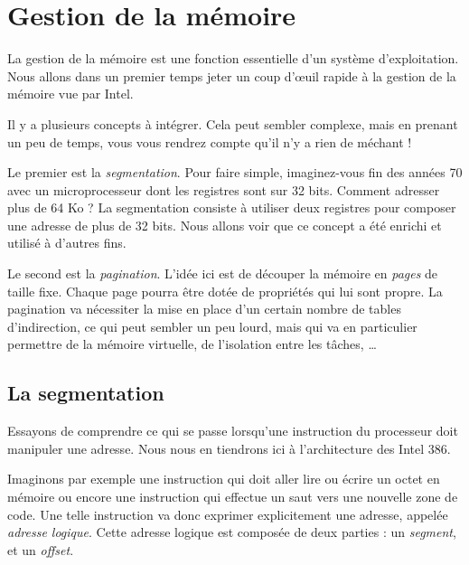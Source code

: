 \section{Gestion de la mémoire}

   La gestion de la mémoire est une fonction essentielle d'un système
d'exploitation. Nous allons dans un premier temps jeter un coup
d'\oe{}uil rapide à la gestion de la mémoire vue par Intel.

   Il y a plusieurs concepts à intégrer. Cela peut sembler complexe,
mais en prenant un peu de temps, vous vous rendrez compte qu'il n'y a
rien de méchant !

   Le premier est la {\em segmentation}. Pour faire simple,
imaginez-vous fin des années 70 avec un microprocesseur dont les
registres sont sur 32 bits. Comment adresser plus de 64 Ko ? La
segmentation consiste à utiliser deux registres pour composer une
adresse de plus de 32 bits. Nous allons voir que ce concept a été
enrichi et utilisé à d'autres fins.

   Le second est la {\em pagination}. L'idée ici est de découper la
mémoire en {\em pages} de taille fixe. Chaque page pourra être dotée
de propriétés qui lui sont propre. La pagination va nécessiter la
mise en place d'un certain nombre de tables d'indirection, ce qui peut
sembler un peu lourd, mais qui va en particulier permettre de la
mémoire virtuelle, de l'isolation entre les tâches, \ldots

%
\subsection{La segmentation}

   Essayons de comprendre ce qui se passe lorsqu'une instruction du
processeur doit manipuler une adresse. Nous nous en tiendrons ici à
l'architecture des Intel 386.
   
   Imaginons par exemple une instruction qui doit aller lire ou écrire
un octet en mémoire ou encore une instruction qui effectue un saut
vers une nouvelle zone de code. Une telle instruction va donc exprimer
explicitement une adresse, appelée {\em adresse logique}. Cette
adresse logique est composée de deux parties : un {\em segment}, et un
{\em offset}.


